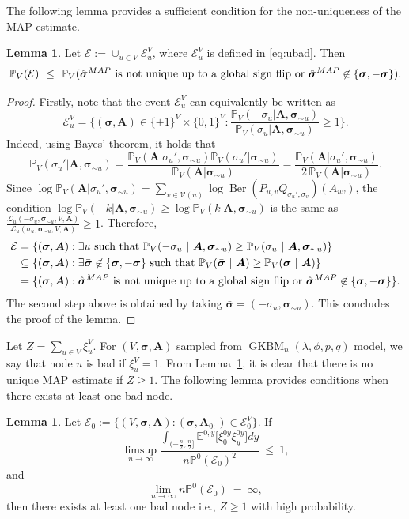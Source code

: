 \documentclass[letterpaper,11pt]{article}
\newtheorem{lem}[thm]{Lemma}
\theoremstyle{definition}
\def\1{\mathbf{1}}
\def\E{\mathbb{E}}
\def\P{\mathbb{P}}
\def\bA{\bm{A}}
\newcommand{\bsigma}{\bm{\sigma}}
\def\cE{\mathcal{E}}
\def\cL{\mathcal{L}}
\def\cV{\mathcal{V}}
\def\weq{ \ = \ }
\def\wle{ \ \le \ }
\newcommand{\Ber}{\operatorname{Ber}}
\numberwithin{equation}{section}
\newcommand{\GKBM}{\operatorname{GKBM}}
\newcommand{\la}{\lambda}
\newcommand{\map}{\hat{\bsigma}^{\rm MAP}}
\newcommand{\umap}{\hat{\sigma}^{\rm MAP}_u}
\newtheorem{lem}[thm]{Lemma}
\theoremstyle{definition}
\def\1{\mathbf{1}}
\def\E{\mathbb{E}}
\def\P{\mathbb{P}}
\def\bA{\bm{A}}
\newcommand{\bsigma}{\bm{\sigma}}
\def\cE{\mathcal{E}}
\def\cL{\mathcal{L}}
\def\cV{\mathcal{V}}
\def\weq{ \ = \ }
\def\wle{ \ \le \ }
\newcommand{\Ber}{\operatorname{Ber}}
\numberwithin{equation}{section}
\newcommand{\GKBM}{\operatorname{GKBM}}
\newcommand{\la}{\lambda}
\newcommand{\map}{\hat{\bsigma}^{\rm MAP}}
\newcommand{\umap}{\hat{\sigma}^{\rm MAP}_u}
\theoremstyle{thmstyletwo}%
\begin{document}
The following lemma provides a sufficient condition for the non-uniqueness of the MAP estimate.
\begin{lem}
\label{lem:compMAPnec}
Let $\cE := \cup_{u\in V} \cE_u^V$, where $\cE_u^V$ is defined in \eqref{eq:ubad}. Then 
\[
\P_{V}(\cE) \wle \P_{V}( \map \text{ is not unique up to a global sign flip or }\map \not \in \{\bsigma,-\bsigma\}).
\]
\end{lem}
\begin{proof}
Firstly, note that the event $\cE_u^V$ can equivalently be written as
\[
\cE_{u}^V=\bigg\{(\bsigma,\bA) \in \{\pm1\}^V \times \{0,1\}^V : \frac{\P_V( -\sigma_u|\bA,\bsigma_{\sim u})}{\P_V( \sigma_u|\bA,\bsigma_{\sim u})}\ge 1\bigg\}.
\]
Indeed, using Bayes' theorem, it holds that 
\[
\P_V( \sigma_u'|\bA,\bsigma_{\sim u})=   \frac{\P_V( \bA|\sigma_u',\bsigma_{\sim u}) \P_V(\sigma_u'|\bsigma_{\sim u})}{\P_V(\bA|\bsigma_{\sim u})} = \frac{\P_V( \bA|\sigma_u',\bsigma_{\sim u})}{2 \,\P_V(\bA|\bsigma_{\sim u})}.
\]
Since $\log \P_V( \bA|\sigma_u',\bsigma_{\sim u}) = \sum_{v\in \cV(u)} \log \Ber (P_{u,v} Q_{\sigma_u',\sigma_v})(A_{uv})$, the condition $\log \P_V( -k|\bA,\bsigma_{\sim u}) \ge \log \P_V( k|\bA,\bsigma_{\sim u})$ is the same as 
$\frac{\cL_u(-\sigma_u,\bsigma_{\sim u},V,\bA)}{\cL_u(\sigma_u,\bsigma_{\sim u},V,\bA)}\ge 1$.
Therefore,
\begin{align*}
\cE
&= \{(\bsigma,\bA): \exists u \text{ such that }
\P_{V}(-\sigma_u \ | \ \bA,\bsigma_{\sim u}) \ge  \P_{V}(\sigma_u \ | \ \bA,\bsigma_{\sim u}) \} \\
&\subseteq \{(\bsigma,\bA): \exists \bar{\bsigma}\not \in \{\bsigma,-\bsigma\} \text{ such that }
\P_{V}(\bar{\bsigma} \ | \ \bA) \ge  \P_{V}(\bsigma \ | \ \bA) \} \\
&= \{(\bsigma,\bA): \map \text{ is not unique up to a global sign flip or } \map \not \in \{\bsigma,-\bsigma\} \}.
\end{align*}
The second step above is obtained by taking
$\bar{\bsigma} = (-\sigma_u,\bsigma_{\sim u})$. This concludes the proof of the lemma.
\end{proof}
Let $Z = \sum_{u\in V} \xi_u^V$. For $(V,\bsigma,\bA)$ sampled from $\GKBM_n(\la,\phi,p,q)$ model, we say that node $u$ is bad if $\xi_u^V=1$. From Lemma~\ref{lem:compMAPnec}, it is clear that there is no unique MAP estimate if $Z \ge 1$. The following lemma provides conditions when there exists at least one bad node. 
\begin{lem}
\label{lem:first_second_moment_cond}
Let $\cE_0 := \{(V,\bsigma,\bA): (\bsigma,\bA_{0:})\in \cE_0^V\}$. If 
\begin{equation}
\limsup_{n \to \infty} \frac{ \int_{ (-\frac{n}{2}, \frac{n}{2}]}
\E^{0,y} \Big[ \xi^{0y}_0 \xi^{0y}_y \Big] dy}{n \P^0(\cE_0)^2}
\wle 1,
\label{eq:secondmomentcond}
\end{equation}
and
\begin{equation}
\lim_{n \to \infty} n \P^0(\cE_0)
\weq \infty,
\label{eq:firstmomentcond}
\end{equation}
then there exists at least one bad node i.e., $Z\ge 1$ with high probability.
\end{lem}
\end{document}
